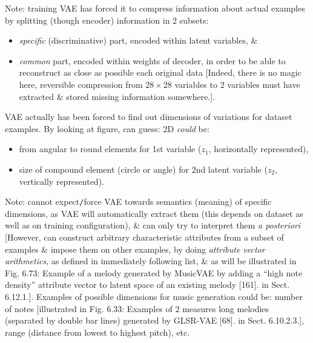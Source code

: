 \documentclass{article}
\begin{document}
\begin{itemize}
\begin{itemize}
\begin{itemize}
			Note: training VAE has forced it to compress information about actual examples by splitting (though encoder) information in 2 subsets:
			\begin{itemize}
				\item {\it specific} (discriminative) part, encoded within latent variables, \&
				\item {\it common} part, encoded within weights of decoder, in order to be able to reconstruct as close as possible each original data [Indeed, there is no magic here, reversible compression from $28\times28$ variables to 2 variables must have extracted \& stored missing information somewhere.].
			\end{itemize}
			VAE actually has been forced to find out dimensions of variations for dataset examples. By looking at figure, can guess: 2D {\it could} be:
			\begin{itemize}
				\item from angular to round elements for 1st variable ($z_1$, horizontally represented),
				\item size of compound element (circle or angle) for 2nd latent variable ($z_2$, vertically represented).
			\end{itemize}
			Note: cannot expect{\tt/}force VAE towards semantics (meaning) of specific dimensions, as VAE will automatically extract them (this depends on dataset as well as on training configuration), \& can only try to interpret them {\it a posteriori} [However, can construct arbitrary characteristic attributes from a subset of examples \& impose them on other examples, by doing {\it attribute vector arithmetics}, as defined in immediately following list, \& as will be illustrated in {\sf Fig. 6.73: Example of a melody generated by MusicVAE by adding a ``high note density'' attribute vector to latent space of an existing melody [161].} in Sect. 6.12.1.]. Examples of possible dimensions for music generation could be: number of notes [illustrated in {\sf Fig. 6.33: Examples of 2 measures long melodies (separated by double bar lines) generated by GLSR-VAE [68].} in Sect. 6.10.2.3.], range (distance from lowest to highest pitch), etc.


\end{itemize}
\end{itemize}
\end{itemize}
\end{document}
